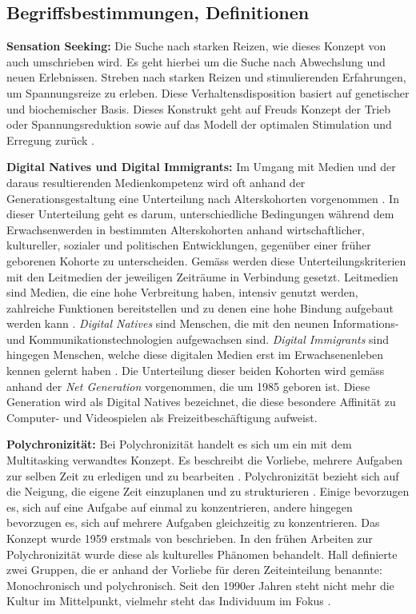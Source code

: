\subsection{Begriffsbestimmungen, Definitionen}
\label{subsection.begriffsbestimmung}
\textbf{Sensation Seeking:}
Die Suche nach starken Reizen, wie dieses Konzept von  auch umschrieben wird. Es geht hierbei um die Suche nach Abwechslung und neuen Erlebnissen. Streben nach starken Reizen und stimulierenden Erfahrungen, um Spannungsreize zu erleben. Diese Verhaltensdisposition basiert auf genetischer und biochemischer Basis. Dieses Konstrukt geht auf Freuds Konzept der Trieb oder Spannungsreduktion sowie auf das Modell der optimalen Stimulation und Erregung zurück \cite{Doernhaus2014}. 
\par
\textbf{Digital Natives und Digital Immigrants:} Im Umgang mit Medien und der daraus resultierenden Medienkompetenz wird oft anhand der Generationsgestaltung eine Unterteilung nach Alterskohorten vorgenommen \cite{Suss2013}. In dieser Unterteilung geht es darum, unterschiedliche Bedingungen während dem Erwachsenwerden in bestimmten Alterskohorten anhand wirtschaftlicher, kultureller, sozialer und politischen Entwicklungen, gegenüber einer früher geborenen Kohorte zu unterscheiden. Gemäss  werden diese Unterteilungskriterien mit den Leitmedien der jeweiligen Zeiträume in Verbindung gesetzt. Leitmedien sind Medien, die eine hohe Verbreitung haben, intensiv genutzt werden, zahlreiche Funktionen bereitstellen und zu denen eine hohe Bindung aufgebaut werden kann \cite{Suss2013}. \textit{Digital Natives} sind Menschen, die mit den neunen Informations- und Kommunikationstechnologien aufgewachsen sind. \textit{Digital Immigrants} sind hingegen Menschen, welche diese digitalen Medien erst im Erwachsenenleben kennen gelernt haben \cite{Prensky2001}. Die Unterteilung dieser beiden Kohorten wird gemäss  anhand der \textit{Net Generation} vorgenommen, die um 1985 geboren ist. Diese Generation wird als Digital Natives bezeichnet, die diese besondere Affinität zu Computer- und Videospielen als Freizeitbeschäftigung aufweist.
\par
\textbf{Polychronizität:}
Bei Polychronizität handelt es sich um ein mit dem Multitasking verwandtes Konzept. Es beschreibt die Vorliebe, mehrere Aufgaben zur selben Zeit zu erledigen und zu bearbeiten \cite{Baethge2010}. Polychronizität bezieht sich auf die Neigung, die eigene Zeit einzuplanen und zu strukturieren \cite{Hecht2005}. Einige bevorzugen es, sich auf eine Aufgabe auf einmal zu konzentrieren, andere hingegen bevorzugen es, sich auf mehrere Aufgaben gleichzeitig zu konzentrieren. Das Konzept wurde 1959 erstmals von \cite{Hall1980} beschrieben. In den frühen Arbeiten zur Polychronizität wurde diese als kulturelles Phänomen behandelt. Hall definierte zwei Gruppen, die er anhand der Vorliebe für deren Zeiteinteilung benannte: Monochronisch und polychronisch. Seit den 1990er Jahren steht nicht mehr die Kultur im Mittelpunkt, vielmehr steht das Individuum im Fokus \cite{Baethge2010}.

